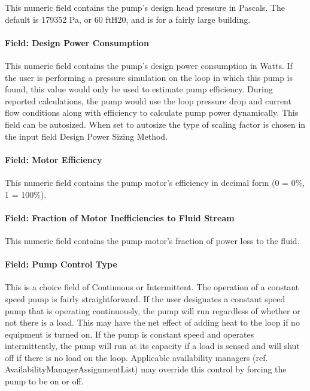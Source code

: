 This numeric field contains the pump's design head pressure in Pascals. The default is 179352 Pa, or 60 ftH20, and is for a fairly large building.

\paragraph{Field: Design Power Consumption}\label{field-design-power-consumption-1}

This numeric field contains the pump's design power consumption in Watts. If the user is performing a pressure simulation on the loop in which this pump is found, this value would only be used to estimate pump efficiency. During reported calculations, the pump would use the loop pressure drop and current flow conditions along with efficiency to calculate pump power dynamically. This field can be autosized. When set to autosize the type of scaling factor is chosen in the input field Design Power Sizing Method.

\paragraph{Field: Motor Efficiency}\label{field-motor-efficiency-1-000}

This numeric field contains the pump motor's efficiency in decimal form (0 = 0\%, 1 = 100\%).

\paragraph{Field: Fraction of Motor Inefficiencies to Fluid Stream}\label{field-fraction-of-motor-inefficiencies-to-fluid-stream-1}

This numeric field contains the pump motor's fraction of power loss to the fluid.

\paragraph{Field: Pump Control Type}\label{field-pump-control-type-1-000}

This is a choice field of Continuous or Intermittent. The operation of a constant speed pump is fairly straightforward. If the user designates a constant speed pump that is operating continuously, the pump will run regardless of whether or not there is a load. This may have the net effect of adding heat to the loop if no equipment is turned on. If the pump is constant speed and operates intermittently, the pump will run at its capacity if a load is sensed and will shut off if there is no load on the loop. Applicable availability managers (ref. AvailabilityManagerAssignmentList) may override this control by forcing the pump to be on or off.

